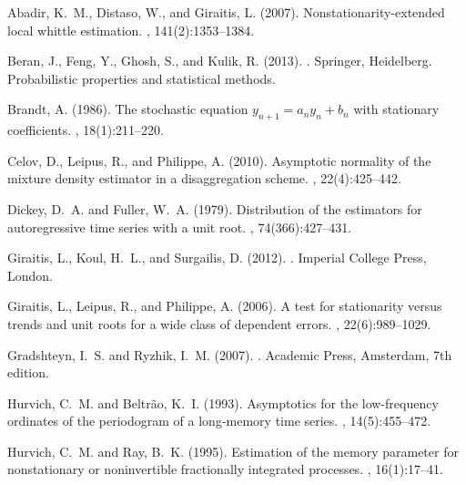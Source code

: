 \documentclass[12pt]{article}
\numberwithin{equation}{section}
\begin{document}
\begin{thebibliography}{}

Abadir, K.~M., Distaso, W., and Giraitis, L. (2007).
\newblock Nonstationarity-extended local whittle estimation.
, 141(2):1353--1384.

Beran, J., Feng, Y., Ghosh, S., and Kulik, R. (2013).
.
\newblock Springer, Heidelberg.
\newblock Probabilistic properties and statistical methods.

Brandt, A. (1986).
\newblock The stochastic equation $y_{n+1} = a_n y_n + b_n$ with stationary
  coefficients.
, 18(1):211--220.

Celov, D., Leipus, R., and Philippe, A. (2010).
\newblock Asymptotic normality of the mixture density estimator in a
  disaggregation scheme.
, 22(4):425--442.

Dickey, D.~A. and Fuller, W.~A. (1979).
\newblock Distribution of the estimators for autoregressive time series with a
  unit root.
,
  74(366):427--431.

Giraitis, L., Koul, H.~L., and Surgailis, D. (2012).
.
\newblock Imperial College Press, London.

Giraitis, L., Leipus, R., and Philippe, A. (2006).
\newblock A test for stationarity versus trends and unit roots for a wide class
  of dependent errors.
, 22(6):989--1029.

Gradshteyn, I.~S. and Ryzhik, I.~M. (2007).
.
\newblock Academic Press, Amsterdam, 7th edition.

Hurvich, C.~M. and Beltr\~{a}o, K.~I. (1993).
\newblock Asymptotics for the low-frequency ordinates of the periodogram of a
  long-memory time series.
, 14(5):455--472.

Hurvich, C.~M. and Ray, B.~K. (1995).
\newblock Estimation of the memory parameter for nonstationary or noninvertible
  fractionally integrated processes.
, 16(1):17--41.


\end{thebibliography}
\end{document}
